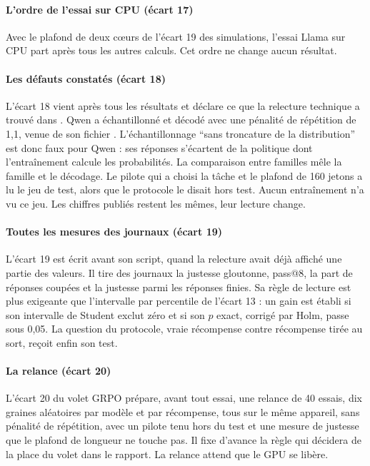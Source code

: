 \paragraph{L'ordre de l'essai sur CPU (écart 17)} Avec le plafond de deux cœurs de l'écart 19 des
simulations, l'essai Llama sur CPU part après tous les autres calculs. Cet ordre ne change aucun
résultat.

\paragraph{Les défauts constatés (écart 18)} L'écart 18 vient après tous les
résultats et déclare ce que la relecture technique a trouvé dans . Qwen a échantillonné
et décodé avec une pénalité de répétition de 1,1, venue de son fichier
. L'échantillonnage \enquote{sans troncature de la distribution} est
donc faux pour Qwen : ses réponses s'écartent de la politique dont l'entraînement calcule les
probabilités. La comparaison entre familles mêle la famille et le décodage. Le pilote qui a choisi la tâche et le plafond de 160
jetons a lu le jeu de test, alors que le protocole le disait hors test. Aucun entraînement n'a vu ce
jeu. Les chiffres publiés restent les mêmes, leur lecture change.

\paragraph{Toutes les mesures des journaux (écart 19)} L'écart 19 est écrit avant son script,
quand la relecture avait déjà affiché une partie des valeurs. Il tire des journaux la justesse gloutonne, pass@8,
la part de réponses coupées et la justesse parmi les réponses finies. Sa règle de lecture est plus
exigeante que l'intervalle par percentile de l'écart 13 : un gain est établi si son intervalle de
Student exclut zéro et si son $p$ exact, corrigé par Holm, passe sous 0,05. La question du protocole,
vraie récompense contre récompense tirée au sort, reçoit enfin son test.

\paragraph{La relance (écart 20)} L'écart 20 du volet GRPO prépare, avant
tout essai, une relance de 40 essais, dix graines aléatoires par modèle et par récompense, tous sur le même appareil,
sans pénalité de répétition, avec un pilote tenu hors du test et une mesure de justesse que le
plafond de longueur ne touche pas. Il fixe d'avance la règle qui décidera de la place du volet dans
le rapport. La relance attend que le GPU se libère.


